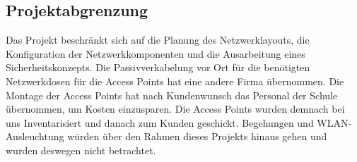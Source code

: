 \subsection{Projektabgrenzung} 
\label{sec:Projektabgrenzung}
Das Projekt beschränkt sich auf die Planung des Netzwerklayouts, die Konfiguration der Netzwerkkomponenten und die Ausarbeitung eines Sicherheitskonzepts. Die Passivverkabelung vor Ort für die benötigten Netzwerkdosen für die Access Points hat eine andere Firma übernommen. Die Montage der Access Points hat nach Kundenwunsch das Personal der Schule übernommen, um Kosten einzusparen. Die Access Points wurden demnach bei uns Inventarisiert und danach zum Kunden geschickt. Begehungen und WLAN-Ausleuchtung würden über den Rahmen dieses Projekts hinaus gehen und wurden deswegen nicht betrachtet.
\begin{comment}
	\item Was ist explizit nicht Teil des Projekts (\insb bei Teilprojekten)?
\end{comment}
